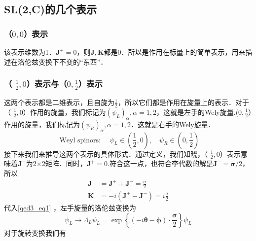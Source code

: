 \subsection{SL(2,C)的几个表示}
\subsubsection{（$0,0$）表示}
该表示维数为1．$\mathbf{J}^{\pm}=0$，则$\mathbf{J},\mathbf{K}$都是0．所以是作用在标量上的简单表示，用来描述在洛伦兹变换下不变的“东西”．
\subsubsection{（ $\frac{1}{2},0$）表示与（$0,\frac{1}{2}$）表示}
这两个表示都是二维表示，且自旋为$\frac{1}{2}$，所以它们都是作用在旋量上的表示．对于（ $\frac{1}{2},0$）作用的旋量，我们标记为$\left(\psi_{L}\right)_{\alpha},\alpha=1,2$，这就是左手的Wely旋量.($0,\frac{1}{2}$）作用的旋量，我们标记为$\left(\psi_{R}\right)_{\alpha},\alpha=1,2$．这就是右手的Wely旋量．
\begin{equation}
\text { Weyl spinors: } \quad \psi_{L} \in\left(\frac{1}{2}, 0\right), \quad \psi_{R} \in\left(0, \frac{1}{2}\right)
\end{equation}
接下来我们来推导这两个表示的具体形式．通过定义，我们知晓，（ $\frac{1}{2},0$）表示意味着$\mathbf{J}^{-}$为2×2矩阵．同时，$\mathbf{J}^{+}=0$.符合这一点，也符合李代数的解是$\mathbf{J}^{-}=\boldsymbol{\sigma} / 2$，所以
\begin{equation}
\begin{aligned}
\mathbf{J} &=\mathbf{J}^{+}+\mathbf{J}^{-}=\frac{\sigma}{2} \\
\mathbf{K} &=-i\left(\mathbf{J}^{+}-\mathbf{J}^{-}\right)=i \frac{\sigma}{2}
\end{aligned}
\end{equation}
代入\autoref{qed3_eq1} ，左手旋量的洛伦兹变换为
\begin{equation}
\psi_{L} \rightarrow \Lambda_{L} \psi_{L}=\exp \left\{(-i \boldsymbol{\theta}-\boldsymbol{\phi}) \cdot \frac{\boldsymbol{\sigma}}{2}\right\} \psi_{L}
\end{equation}
对于旋转变换我们有
